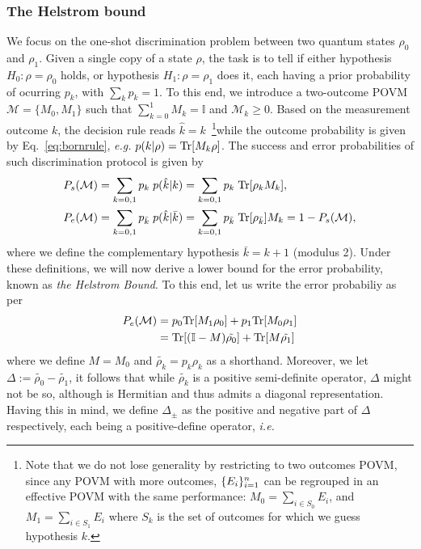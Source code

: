 \subsubsection{The Helstrom bound}\label{sssec:hb}
We focus on the one-shot discrimination problem between two quantum states $\rho_0$ and $\rho_1$. Given a single copy of a state $\rho$, the task is to tell if either hypothesis $H_0: \rho = \rho_0$ holds, or hypothesis $H_1: \rho = \rho_1$ does it, each having a prior probability of ocurring $p_k$, with $\sum_k p_k = 1$. To this end, we introduce a two-outcome POVM $\mathcal{M} = \{ M_0, M_1\}$ such that $\sum_{k=0}^1 M_k = \mathbb{I}$ and $\mathcal{M}_k\geq0$.
Based on the measurement outcome $k$, the decision rule reads $\hat{k} = k$~\footnote{Note that we do not lose generality by restricting to two outcomes POVM, since any POVM with more outcomes, $\lbrace E_i\rbrace_{i=1}^n$ can be regrouped in an effective POVM with the same performance: $M_0 = \sum_{i\in S_0} E_i$, and $M_1 = \sum_{i\in S_1} E_i$ where $S_k$ is the set of outcomes for which we guess hypothesis $k$.}while the outcome probability is given by Eq.~\ref{eq:bornrule}, \textit{e.g.} $p(k|\rho) = \text{Tr}[M_k \rho]$. The success and error probabilities of such discrimination protocol is given by
\begin{align}\label{eq:1_qdisc_PSEMM}
P_s(\mathcal{M}) &= \sum_{k=0,1} p_k\; p(\hat{k}|k) =\sum_{k=0,1} p_k \;\text{Tr}[\rho_k M_k], \\
P_e(\mathcal{M}) &=  \sum_{k=0,1} p_{\bar{k}} \; p(\hat{k}|\bar{k}) = \sum_{k=0,1} p_{\bar{k}} \;\text{Tr}[\rho_{\bar{k}}] M_k = 1-P_s(\mathcal{M}), \nonumber
\end{align}
where we define the complementary hypothesis $\bar{k} = k+1$ (modulus 2). Under these definitions, we will now derive a lower bound for the error probability, known as \textit{the Helstrom Bound}. To this end, let us write the error probabiliy as per
\begin{align}
P_e(\mathcal{M}) &= p_0 \text{Tr}[M_1\rho_0] + p_1 \text{Tr}[M_0\rho_1] \\
&= \text{Tr}[(\mathbb{I} - M) \tilde{\rho_0}] + \text{Tr}[M \tilde{\rho_1}] \nonumber
\end{align}
where we define $M=M_0$ and $\tilde{\rho_k} = p_k \rho_k$ as a shorthand. Moreover, we let $\Delta := \tilde{\rho_0} - \tilde{\rho_1}$, it follows that while $\tilde{\rho_k}$ is a positive semi-definite operator, $\Delta$ might not be so, although is Hermitian and thus admits a diagonal representation. Having this in mind, we define $\Delta_\pm$ as the positive and negative part of $\Delta$ respectively, each being a positive-define operator, \textit{i.e.}
